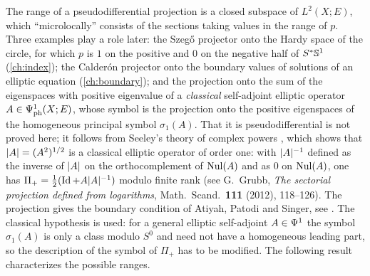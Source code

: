 The range of a pseudodifferential projection is a closed subspace of $L^2(X;E)$,
which ``microlocally'' consists of the sections taking values in the range of $p$.
Three examples play a role later: the Szeg\H{o} projector onto the Hardy space of
the circle, for which $p$ is $1$ on the positive and $0$ on the negative half of
$S^*\mathbb{S}^1$ (\cref{ch:index}); the Calder\'on projector onto the boundary values of
solutions of an elliptic equation (\cref{ch:boundary}); and the projection onto the
sum of the eigenspaces with positive eigenvalue of a \emph{classical} self-adjoint
elliptic operator $A\in\Psi^{1}_{\mathrm{ph}}(X;E)$, whose symbol is the projection onto the
positive eigenspaces of the homogeneous principal symbol $\sigma_1(A)$. That it is
pseudodifferential is not proved here; it follows from Seeley's theory of complex powers
\cite{Seeley}, which shows that $\lvert A\rvert=(A^2)^{1/2}$ is a classical elliptic operator of
order one: with $\lvert A\rvert^{-1}$ defined as the inverse of $\lvert A\rvert$ on the orthocomplement
of $\operatorname{Nul}(A)$ and as $0$ on $\operatorname{Nul}(A)$, one has $\Pi_+=\frac12(\operatorname{Id}+A\lvert A\rvert^{-1})$ modulo
finite rank (see G.~Grubb, \emph{The sectorial projection defined from logarithms},
Math.\ Scand.\ \textbf{111} (2012), 118--126). The projection gives the boundary condition
of Atiyah, Patodi and Singer, see \cite{Melrose-APS}. The classical hypothesis is used:
for a general elliptic self-adjoint $A\in\Psi^{1}$ the symbol $\sigma_1(A)$ is only a
class modulo $S^0$ and need not have a homogeneous leading part, so the description of
the symbol of $\Pi_+$ has to be modified. The
following result characterizes the possible ranges.

